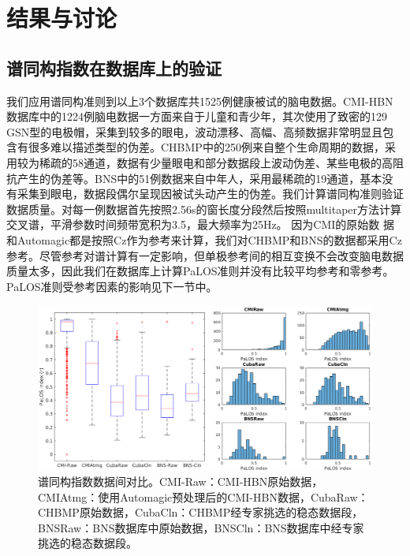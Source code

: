 \section{结果与讨论}
\subsection{谱同构指数在数据库上的验证}
我们应用谱同构准则到以上3个数据库共1525例健康被试的脑电数据。CMI-HBN数据库中的1224例脑电数据一方面来自于儿童和青少年，其次使用了致密的129 GSN型的电极帽，采集到较多的眼电，波动漂移、高幅、高频数据非常明显且包含有很多难以描述类型的伪差。CHBMP中的250例来自整个生命周期的数据，采用较为稀疏的58通道，数据有少量眼电和部分数据段上波动伪差、某些电极的高阻抗产生的伪差等。BNS中的51例数据来自中年人，采用最稀疏的19通道，基本没有采集到眼电，数据段偶尔呈现因被试头动产生的伪差。我们计算谱同构准则验证数据质量。对每一例数据首先按照2.56s的窗长度分段然后按照multitaper方法计算交叉谱，平滑参数时间频带宽积为3.5，最大频率为25Hz。 因为CMI的原始数
据和Automagic都是按照Cz作为参考来计算，我们对CHBMP和BNS的数据都采用Cz参考。尽管参考对谱计算有一定影响，但单极参考间的相互变换不会改变脑电数据质量太多，因此我们在数据库上计算PaLOS准则并没有比较平均参考和零参考。PaLOS准则受参考因素的影响见下一节中。
\begin{figure}[!h]
	\includegraphics[width=15cm]{pic/palos/comparison.png}
	\caption{谱同构指数数据间对比。CMI-Raw：CMI-HBN原始数据，CMIAtmg：使用Automagic预处理后的CMI-HBN数据，CubaRaw：CHBMP原始数据，CubaCln：CHBMP经专家挑选的稳态数据段，BNSRaw：BNS数据库中原始数据，BNSCln：BNS数据库中经专家挑选的稳态数据段。}
	\label{5:comp}
\end{figure}

